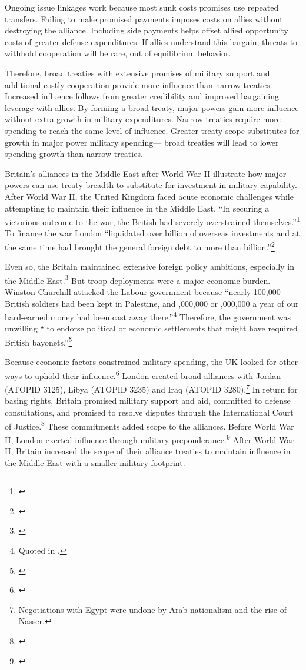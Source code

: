 \documentclass[12pt]{article}
\begin{document}
Ongoing issue linkages work because most sunk costs promises use repeated transfers. 
Failing to make promised payments imposes costs on allies without destroying the alliance. 
Including side payments helps offset allied opportunity costs of greater defense expenditures. 
If allies understand this bargain, threats to withhold cooperation will be rare, out of equilibrium behavior. 


Therefore, broad treaties with extensive promises of military support and additional costly cooperation provide more influence than narrow treaties.
Increased influence follows from greater credibility and improved bargaining leverage with allies.  
By forming a broad treaty, major powers gain more influence without extra growth in military expenditures. 
Narrow treaties require more spending to reach the same level of influence. 
Greater treaty scope substitutes for growth in major power military spending--- broad treaties will lead to lower spending growth than narrow treaties. 


Britain's alliances in the Middle East after World War II illustrate how major powers can use treaty breadth to substitute for investment in military capability. 
After World War II, the United Kingdom faced acute economic challenges while attempting to maintain their influence in the Middle East. 
``In securing a victorious outcome to the war, the British had severely overstrained themselves.''\footnote{\citep[pg. 367]{Kennedy1987}}
To finance the war London ``liquidated over  billion of overseas investments and at the same time had brought the general foreign debt to more than  billion.''\footnote{\citep[pg. 12]{Louis1984}}
 

Even so, the Britain maintained extensive foreign policy ambitions, especially in the Middle East.\footnote{\citep{Mayhew1950, Rahman1982}} 
But troop deployments were a major economic burden. 
Winston Churchill attacked the Labour government because ``nearly 100,000 British soldiers had been kept in Palestine, and ,000,000 or ,000,000 a year of our hard-earned money had been cast away there.''\footnote{Quoted in \citet[pg. 11]{Louis1984}.}
Therefore, the government was unwilling `` to endorse political or economic settlements that might have required British bayonets.''\footnote{\citep[pg. 15]{Louis1984}}


Because economic factors constrained military spending, the UK looked for other ways to uphold their influence.\footnote{\citep{Monroe1963, Louis1984}}
London created broad alliances with Jordan (ATOPID 3125), Libya (ATOPID 3235) and Iraq (ATOPID 3280).\footnote{Negotiations with Egypt were undone by Arab nationalism and the rise of Nasser.} 
In return for basing rights, Britain promised military support and aid, committed to defense consultations, and promised to resolve disputes through the International Court of Justice.\footnote{\citep{Leedsetal2002}} 
These commitments added scope to the alliances. 
Before World War II, London exerted influence through military preponderance.\footnote{\citep{Monroe1963}}
After World War II, Britain increased the scope of their alliance treaties to maintain influence in the Middle East with a smaller military footprint. 
\end{document}

